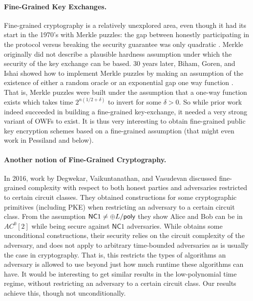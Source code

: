 \paragraph{Fine-Grained Key Exchanges.} Fine-grained cryptography is a relatively unexplored area, even though it had its start in the 1970's with Merkle puzzles: the gap between honestly participating in the protocol versus breaking the security guarantee was only quadratic \cite{Merkle78}. Merkle originally did not describe a plausible hardness assumption under which the security of the key exchange can be based. 30 years later, Biham, Goren, and Ishai showed how to implement Merkle puzzles by making an assumption of the existence of either a random oracle or an exponential gap one way function \cite{BGI08}. That is, Merkle puzzles were built under the assumption that a one-way function exists which takes time $2^{n(1/2+\delta)}$ to invert for some $\delta>0$. So while prior work indeed succeeded in building a fine-grained key-exchange, it needed a very strong variant of OWFs to exist. It is thus very interesting to obtain fine-grained public key encryption schemes based on a fine-grained assumption (that might even work in Pessiland and below).

\paragraph{Another notion of Fine-Grained Cryptography.} In 2016, work by Degwekar, Vaikuntanathan, and Vasudevan \cite{DVV16} discussed fine-grained complexity with respect to both honest parties and adversaries restricted to certain circuit classes. They obtained constructions for some cryptographic primitives (including PKE) when restricting an adversary to a certain circuit class. From the assumption $\mathsf{NC}1 \neq \oplus L/\mathsf{poly}$ they show Alice and Bob can be in $AC^0[2]$ while being secure against $\mathsf{NC}1$ adversaries. While \cite{DVV16} obtains some unconditional constructions, their security relies on the circuit complexity of the adversary, and does not apply to arbitrary time-bounded adversaries as is usually the case in cryptography. That is, this restricts the types of algorithms an adversary is allowed to use beyond just how much runtime these algorithms can have. It would be interesting to get similar results in the low-polynomial time regime, without restricting an adversary to a certain circuit class. Our results achieve this, though not unconditionally.

